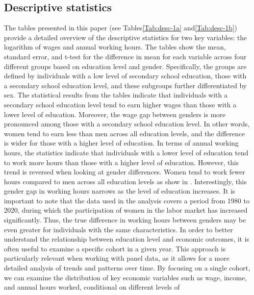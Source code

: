 \documentclass[12pt]{article}
\begin{document}
\subsection{Descriptive statistics}

The tables presented in this paper (see Tables\ref{Tab:desc-1a} and\ref{Tab:desc-1b}) provide a detailed overview of the
descriptive statistics for two key variables: the logarithm of wages and annual working hours. The tables show the mean,
standard error, and t-test for the difference in mean for each variable across four different groups based on education
level and gender. Specifically, the groups are defined by individuals with a low level of secondary school education,
those with a secondary school education level, and these subgroups further differentiated by sex.
\newline
The statistical results from the tables indicate that individuals with a secondary school education level tend to earn
higher wages than those with a lower level of education. Moreover, the wage gap between genders is more pronounced among
those with a secondary school education level. In other words, women tend to earn less than men across all education
levels, and the difference is wider for those with a higher level of education.
\newline
In terms of annual working hours, the statistics indicate that individuals with a lower level of education tend to work
more hours than those with a higher level of education. However, this trend is reversed when looking at gender
differences. Women tend to work fewer hours compared to men across all education levels as show in \citet{goldin}. Interestingly, this gender gap
in working hours narrows as the level of education increases. It is important to note that the data used in the analysis
covers a period from 1980 to 2020, during which the participation of women in the labor market has increased
significantly. Thus, the true difference in working hours between genders may be even greater for individuals with the
same characteristics.\newline
In order to better understand the relationship between education level and economic outcomes, it is often useful to
examine a specific cohort in a given year. This approach is particularly relevant when working with panel data, as it
allows for a more detailed analysis of trends and patterns over time. By focusing on a single cohort, we can examine the
distribution of key economic variables such as wage, income, and annual hours worked, conditional on different levels of
\end{document}
